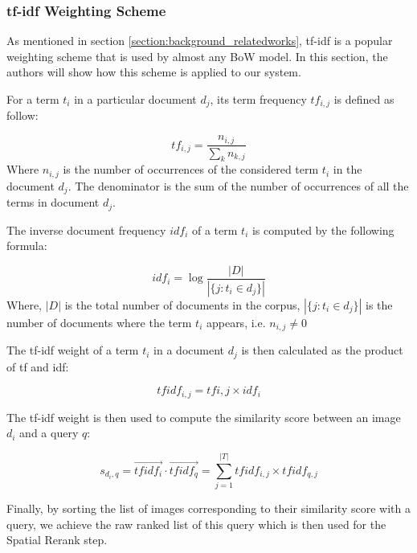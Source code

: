 \documentclass[10pt,conference,]{IEEEtran}
\begin{document}
\subsubsection{tf-idf Weighting Scheme} \label{section:tfidf_weighting}

As mentioned in section \ref{section:background_relatedworks}, tf-idf is a popular weighting scheme that is used by almost any BoW model. In this section, the authors will show how this scheme is applied to our system.

For a term $t_{i}$ in a particular document $d_{j}$, its term frequency $tf_{i, j}$ is defined as follow:

\begin{equation} 
        tf_{i, j} = \frac{n_{i, j}}{\sum\limits_{k} n_{k, j}}
\end{equation}
Where $n_{i, j}$ is the number of occurrences of the considered term $t_{i}$ in the document $d_{j}$. The denominator is the sum of the number of occurrences of all the terms in document $d_{j}$.

The inverse document frequency $idf_{i}$ of a term $t_{i}$ is computed by the following formula:

\begin{equation}
        idf_{i} = \log{\frac{\left|D\right|}{\left|\{j: t_{i} \in d_{j}\}\right|}}
\end{equation}
Where, $\left|D\right|$ is the total number of documents in the corpus, $\left|\{j: t_{i} \in d_{j}\}\right|$ is the number of documents where the term $t_{i}$ appears, i.e. $n_{i, j} \ne 0$

The tf-idf weight of a term $t_{i}$ in a document $d_{j}$ is then calculated as the product of tf and idf:

\begin{equation}
{tfidf}_{i, j} = tf{i, j} \times idf_{i}
\end{equation}

The tf-idf weight is then used to compute the similarity score between an image $d_{i}$ and a query $q$:

\begin{equation}
s_{d_{i}, q} = \vec{{tfidf}_{i}} \cdot \vec{{tfidf}_{q}} = \sum\limits_{j = 1}^{\left|T\right|} {tfidf}_{i, j} \times {tfidf}_{q, j}
\end{equation} 

Finally, by sorting the list of images corresponding to their similarity score with a query, we achieve the raw ranked list of this query which is then used for the Spatial Rerank step.
\end{document}
